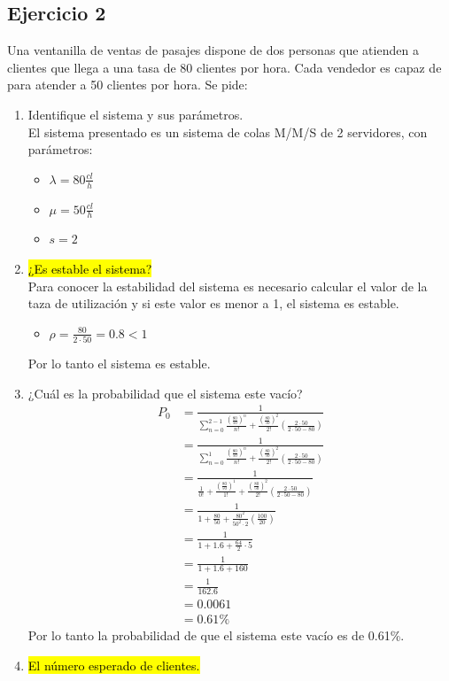 \documentclass{templateNote}
\begin{document}
\newpage
\subsection{Ejercicio 2}
\noindent Una ventanilla de ventas de pasajes dispone de dos personas que atienden a clientes que llega a una tasa de 80 clientes por hora. Cada vendedor es capaz de para atender a 50 clientes por hora. Se pide:
\begin{enumerate}[label=(\alph*)]
    \item Identifique el sistema y sus parámetros. \\
    El sistema presentado es un sistema de colas M/M/S de 2 servidores, con parámetros:
    \begin{itemize}
        \item $\lambda = 80 \frac{cl}{h}$
        \item $\mu = 50 \frac{cl}{h}$
        \item $s = 2$
    \end{itemize}
    \item \hl{¿Es estable el sistema?} \\
    Para conocer la estabilidad del sistema es necesario calcular el valor de la taza de utilización y si este valor es menor a 1, el sistema es estable.
    \begin{itemize}
        \item $\rho = \frac{80}{2 \cdot 50} = 0.8 < 1$
    \end{itemize}
    Por lo tanto el sistema es estable.
    \item ¿Cuál es la probabilidad que el sistema este vacío?
    \begin{align*}
        P_0 &= \frac{1}{\sum_{n=0}^{2-1} \frac{(\frac{80}{50})^n}{n!} + \frac{(\frac{80}{50})^2}{2!} \left(\frac{2\cdot50}{2\cdot50-80}\right)} \\
        &= \frac{1}{\sum_{n=0}^{1} \frac{(\frac{80}{50})^n}{n!} + \frac{(\frac{80}{50})^2}{2!} \left(\frac{2\cdot50}{2\cdot50-80}\right)} \\
        &= \frac{1}{\frac{1}{0!} + \frac{(\frac{80}{50})^1}{1!} + \frac{(\frac{80}{50})^2}{2!} \left(\frac{2\cdot50}{2\cdot50-80}\right)} \\
        &= \frac{1}{1 + \frac{80}{50} + \frac{80^2}{50^2 \cdot 2} \left(\frac{100}{20}\right)} \\
        &= \frac{1}{1 + 1.6 + \frac{64}{2} \cdot 5} \\
        &= \frac{1}{1 + 1.6 + 160} \\
        &= \frac{1}{162.6} \\
        &= 0.0061 \\
        &= 0.61\%
    \end{align*} 
    Por lo tanto la probabilidad de que el sistema este vacío es de 0.61\%.
    \item \hl{El número esperado de clientes.}\\
    

\end{enumerate}
\end{document}
